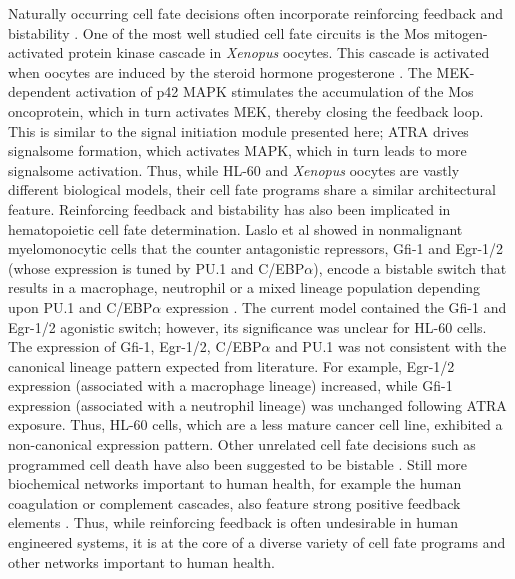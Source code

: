 \documentclass[12pt]{article}
\begin{document}
Naturally occurring cell fate decisions often incorporate reinforcing feedback and bistability \cite{Ferrell:2002aa,Laslo2006}.
One of the most well studied cell fate circuits is the Mos mitogen-activated protein kinase cascade in \textit{Xenopus} oocytes.
This cascade is activated when oocytes are induced by the steroid hormone progesterone \cite{Xiong:2003aa}.
The MEK-dependent activation of p42 MAPK stimulates the accumulation of the Mos oncoprotein, which in turn activates MEK, thereby closing the feedback loop.
This is similar to the signal initiation module presented here; ATRA drives signalsome formation, which activates MAPK, which in turn leads to more signalsome activation.
Thus, while HL-60 and \textit{Xenopus} oocytes are vastly different biological models, their cell fate programs share a similar architectural feature.
Reinforcing feedback and bistability has also been implicated in hematopoietic cell fate determination.
Laslo et al showed in nonmalignant myelomonocytic cells that the counter antagonistic repressors, Gfi-1 and Egr-1/2 (whose expression is tuned by PU.1 and C/EBP$\alpha$), encode a bistable switch that
results in a macrophage, neutrophil or a mixed lineage population depending upon PU.1 and C/EBP$\alpha$ expression \cite{Laslo2006}.
The current model contained the Gfi-1 and Egr-1/2 agonistic switch; however, its significance was unclear for HL-60 cells.
The expression of Gfi-1, Egr-1/2, C/EBP$\alpha$ and PU.1 was not consistent with the canonical lineage pattern expected from literature.
For example, Egr-1/2 expression (associated with a macrophage lineage) increased, while Gfi-1 expression (associated with a neutrophil lineage)
was unchanged following ATRA exposure.
Thus, HL-60 cells, which are a less mature cancer cell line, exhibited a non-canonical expression pattern.
Other unrelated cell fate decisions such as programmed cell death have also been suggested to be bistable \cite{Bagci:2006aa}.
Still more biochemical networks important to human health, for example the human coagulation or complement cascades, also feature strong positive feedback elements \cite{Luan:2007aa}.
Thus, while reinforcing feedback is often undesirable in human engineered systems, it is at the core of a diverse variety of
cell fate programs and other networks important to human health.
\end{document}
